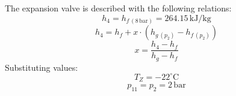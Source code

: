 The expansion valve is described with the following relations:  
\[
h_4 = h_{f \, (8 \, \text{bar})} = 264.15 \, \text{kJ/kg}
\]
\[
h_4 = h_{f} + x \cdot (h_{g \, (p_2)} - h_{f \, (p_2)})
\]
\[
x = \frac{h_4 - h_{f}}{h_{g} - h_{f}}
\]
Substituting values:  
\[
T_Z = -22^\circ\text{C}
\]
\[
p_{11} = p_{2} = 2 \, \text{bar}
\]